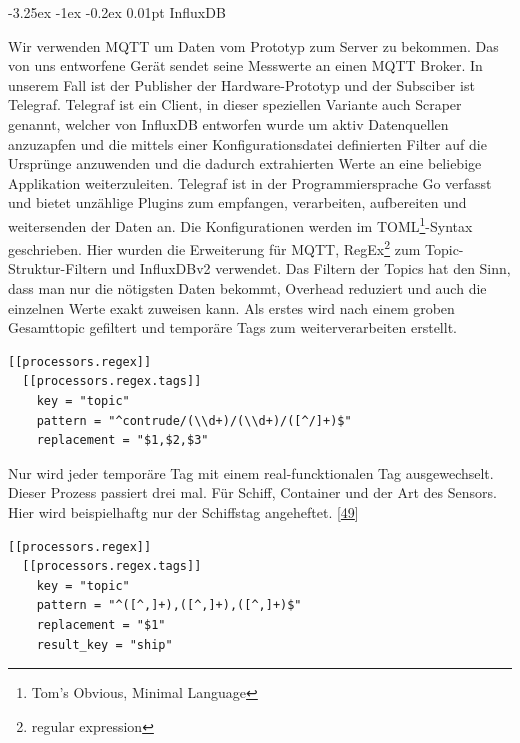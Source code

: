 \documentclass[
    headings=optiontotocandhead,%
    twoside,
    numbers=noenddot,%
    12pt, %
    titlepage, %
    parskip=full, %
    listof=leveldown, 
    numbers=noenddot, %
    a4paper,DIV=14,
    BCOR=15mm,
]{scrbook}
\makeatletter
\renewcommand\paragraph{\@startsection{paragraph}{4}{\z@}%
    {-3.25ex \@plus -1ex \@minus -0.2ex}%
    {0.01pt}%
    {\raggedsection\normalfont\sectfont\nobreak\size@paragraph}%
  }
\makeatother
\begin{document}
\hypertarget{influxdb}{%
\paragraph{InfluxDB}\label{influxdb}}

Wir verwenden MQTT um Daten vom Prototyp zum Server zu bekommen. Das von
uns entworfene Gerät sendet seine Messwerte an einen MQTT Broker. In
unserem Fall ist der Publisher der Hardware-Prototyp und der Subsciber
ist Telegraf. Telegraf ist ein Client, in dieser speziellen Variante
auch Scraper genannt, welcher von InfluxDB entworfen wurde um aktiv
Datenquellen anzuzapfen und die mittels einer Konfigurationsdatei
definierten Filter auf die Ursprünge anzuwenden und die dadurch
extrahierten Werte an eine beliebige Applikation weiterzuleiten.
Telegraf ist in der Programmiersprache Go verfasst und bietet unzählige
Plugins zum empfangen, verarbeiten, aufbereiten und weitersenden der
Daten an. Die Konfigurationen werden im TOML\footnote{Tom's Obvious,
  Minimal Language}-Syntax geschrieben. Hier wurden die Erweiterung für
MQTT, RegEx\footnote{regular expression} zum Topic-Struktur-Filtern und
InfluxDBv2 verwendet. Das Filtern der Topics hat den Sinn, dass man nur
die nötigsten Daten bekommt, Overhead reduziert und auch die einzelnen
Werte exakt zuweisen kann. Als erstes wird nach einem groben Gesamttopic
gefiltert und temporäre Tags zum weiterverarbeiten erstellt.

\begin{lstlisting}[caption={Filtern der Topics in Telegraf mittels Regex}]
[[processors.regex]]
  [[processors.regex.tags]]
    key = "topic"
    pattern = "^contrude/(\\d+)/(\\d+)/([^/]+)$"
    replacement = "$1,$2,$3"
\end{lstlisting}

Nur wird jeder temporäre Tag mit einem real-funcktionalen Tag
ausgewechselt. Dieser Prozess passiert drei mal. Für Schiff, Container
und der Art des Sensors. Hier wird beispielhaftg nur der Schiffstag
angeheftet. {[}\protect\hyperlink{ref-gpt-telegraf-regex}{49}{]}

\begin{lstlisting}[caption={Ersetzen der temporären Topic-Tags durch funcktionale Tags}]
[[processors.regex]]
  [[processors.regex.tags]]
    key = "topic"
    pattern = "^([^,]+),([^,]+),([^,]+)$"
    replacement = "$1"
    result_key = "ship"
\end{lstlisting}
\end{document}

